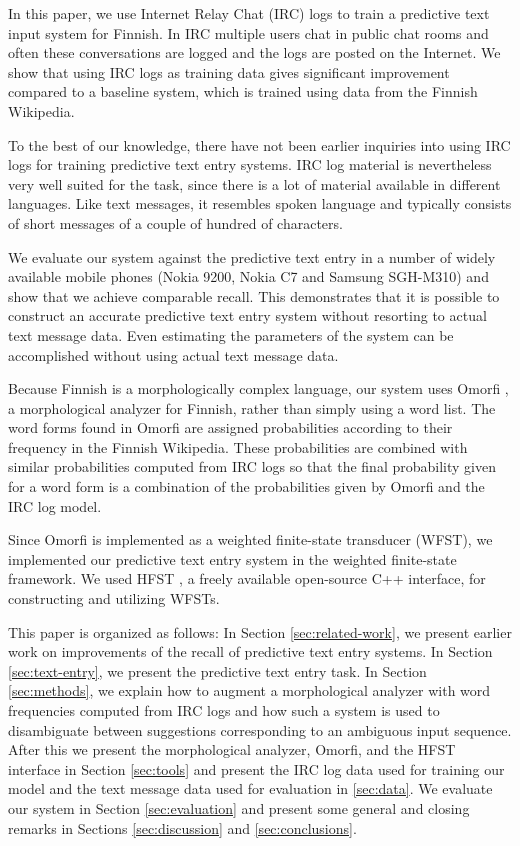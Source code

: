 \documentclass[a4paper,conference]{IEEEtran}
\begin{document}
In this paper, we use Internet Relay Chat (IRC) logs to train a
predictive text input system for Finnish. In IRC multiple users chat
in public chat rooms and often these conversations are logged and the
logs are posted on the Internet. We show that using IRC logs as
training data gives significant improvement compared to a baseline
system, which is trained using data from the Finnish Wikipedia.

To the best of our knowledge, there have not been earlier inquiries
into using IRC logs for training predictive text entry systems. IRC
log material is nevertheless very well suited for the task, since
there is a lot of material available in different languages. Like text
messages, it resembles spoken language and typically consists of short
messages of a couple of hundred of characters.

We evaluate our system against the predictive text entry in a number
of widely available mobile phones (Nokia 9200, Nokia C7 and Samsung
SGH-M310) and show that we achieve comparable recall. This
demonstrates that it is possible to construct an accurate predictive
text entry system without resorting to actual text message data. Even
estimating the parameters of the system can be accomplished without
using actual text message data.

Because Finnish is a morphologically complex language, our system uses Omorfi
\cite{pirinen/2011/nodalida}, a morphological analyzer for Finnish, rather than simply using a word list. The word forms found in Omorfi are assigned probabilities according to their
frequency in the Finnish Wikipedia. These probabilities are combined
with similar probabilities computed from IRC logs so that the final
probability given for a word form is a combination of the
probabilities given by Omorfi and the IRC log model.

Since Omorfi is implemented as a weighted finite-state transducer
(WFST), we implemented our predictive text entry system in the
weighted finite-state framework. We used HFST
\cite{conf/sfcm/Linden2009}, a freely available open-source C++
interface, for constructing and utilizing WFSTs.

This paper is organized as follows: In Section \ref{sec:related-work},
we present earlier work on improvements of the recall of predictive text
entry systems. In Section \ref{sec:text-entry}, we present the predictive
text entry task. In Section \ref{sec:methods}, we explain how to
augment a morphological analyzer with word frequencies computed from
IRC logs and how such a system is used to disambiguate between
suggestions corresponding to an ambiguous input sequence. After this
we present the morphological analyzer, Omorfi, and the HFST interface
in Section \ref{sec:tools} and present the IRC log data used for
training our model and the text message data used for evaluation in
\ref{sec:data}. We evaluate our system in Section \ref{sec:evaluation}
and present some general and closing remarks in Sections
\ref{sec:discussion} and \ref{sec:conclusions}.
\end{document}
